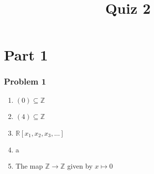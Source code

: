 \documentclass[11pt, letterpaper]{article}
\title{Quiz 2}
\begin{document}
\part*{Part 1}
\section{Problem 1}

\begin{enumerate}
	\item $(0)\subseteq \mathbb{Z} $
	\item $(4)\subseteq \mathbb{Z} $
	\item $\mathbb{R} [x_1,x_2,x_3, \ldots ]$
	\item a
	\item The map $\mathbb{Z} \to \mathbb{Z} $ given by $x\mapsto 0$
\end{enumerate}
\end{document}
